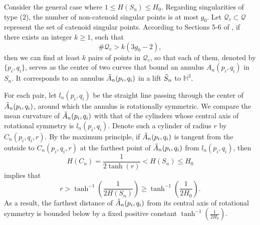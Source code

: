 \documentclass[12pt,a4paper]{amsart}
\numberwithin{equation}{section}
\theoremstyle{plain}
\theoremstyle{named}
\theoremstyle{definition}
\begin{document}
     Consider the general case where $1\leq H(S_n)\leq H_0$.
     Regarding singularities of type (2), the number of non-catenoid singular points is at most $g_0$. Let $\mathcal{Q}_c\subset\mathcal{Q}$ represent the set of catenoid singular points. 
     According to Sections 5-6 of \cite{Meeks-Tinaglia}, if there exists an integer $k\geq 1$, such that \begin{equation}\label{equ_number of singularities}
         \#\mathcal{Q}_c> k(3g_0-2),
     \end{equation} then we can find at least $k$ pairs of points in $\mathcal{Q}_c$, so that each of them, denoted by $\{p_i,q_i\}$, serves as the center of two curves that bound an annulus $A_n(p_i,q_i)$ in $S_n$. It corresponds to an annulus $\Tilde{A}_n(p_i,q_i)$ in a lift $\Tilde{S}_n$ to $\mathbb{H}^3$.
     
     For each pair, let $l_n(p_i,q_i)$ be the straight line passing through the center of $\Tilde{A}_n(p_i,q_i)$, around which the annulus is rotationally symmetric.
     We compare the mean curvature of $\Tilde{A}_n(p_i,q_i)$ with that of the cylinders whose central axis of rotational symmetry is $l_n(p_i,q_i)$. Denote such a cylinder of radius $r$ by $C_n(p_i,q_i,r)$. By the maximum principle, if $\Tilde{A}_n(p_i,q_i)$ is tangent from the outside to $C_n(p_i,q_i,r)$ at the farthest point of $\Tilde{A}_n(p_i,q_i)$ from $l_n(p_i,q_i)$, then \begin{equation*}
         H(C_n)=\frac{1}{2\tanh(r)}<H(S_n)\leq H_0
     \end{equation*}
     implies that 
     \begin{equation*}
         r>\tanh^{-1}\left(\frac{1}{2H(S_n)}\right)\geq \tanh^{-1}\left(\frac{1}{2H_0}\right).
     \end{equation*}
     As a result, the farthest distance of $\Tilde{A}_n(p_i,q_i)$ from its central axis of rotational symmetry is bounded below by a fixed positive constant $\tanh^{-1}\left(\frac{1}{2H_0}\right)$. 
     
\end{document}
